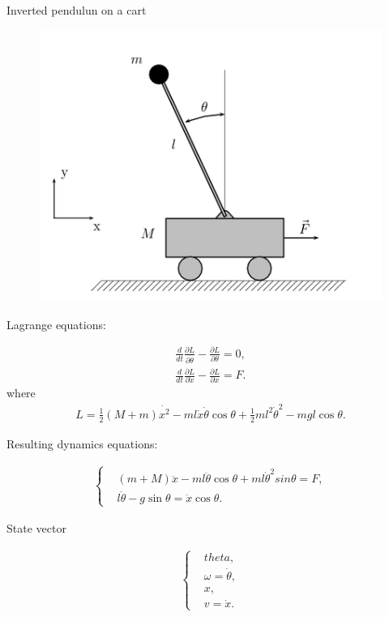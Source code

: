 \documentclass{article}
\begin{document}
\begin{center}
	Inverted pendulun on a cart
\end{center}

\begin{figure}[h]
	\centering
	\includegraphics[scale=2]{Cart-pendulum.png}
\end{figure}

Lagrange equations:

\begin{eqnarray}
	\frac{d}{dt}\frac{\partial L}{\partial \dot{\theta}}-\frac{\partial L}{\partial \theta}=0,\\
	\frac{d}{dt}\frac{\partial L}{\partial \dot{x}}-\frac{\partial L}{\partial x}=F.
\end{eqnarray}
where
\begin{eqnarray}
	L=\frac{1}{2}(M+m)\dot{x^2}-ml\dot{x}\dot{\theta}\cos\theta +\frac{1}{2}ml^2\dot{\theta}^2-mgl\cos\theta.
\end{eqnarray}

Resulting dynamics equations:

\begin{eqnarray}
	\left\{
		\begin{aligned}
		& (m+M)\ddot{x}-ml\ddot{\theta}\cos\theta+ml\dot{\theta}^2sin\theta = F,\\
		& l\ddot{\theta}-g\sin\theta = \ddot{x}\cos\theta.
		\end{aligned}
	\right.
\end{eqnarray}

State vector

\begin{eqnarray}
\left\{
\begin{aligned}
& theta,\\
& \omega = \dot{\theta},\\
& x,\\
& v =\dot{x}.
\end{aligned}
\right.
\end{eqnarray}
\end{document}
